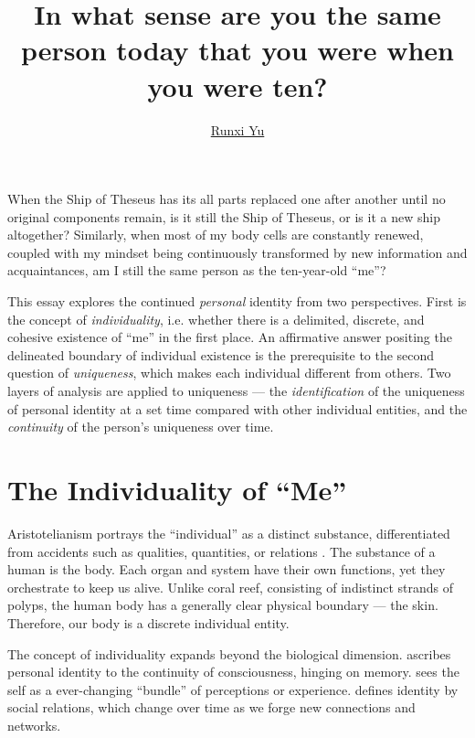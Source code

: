 \documentclass[a4paper,english,12pt]{scrartcl}
\begin{document}
\title{In what sense are you the same person today that you were when you
were ten?}
\author{\href{https://www.andrewyu.org/}{Runxi Yu}}
\date{}

\maketitle

\noindent When the Ship of Theseus has its all parts replaced one
after another until no original components remain, is it still the
Ship of Theseus, or is it a new ship altogether?  Similarly, when
most of my body cells are constantly renewed, coupled with my mindset
being continuously transformed by new information and acquaintances,
am I still the same person as the ten-year-old ``me''?

This essay explores the continued \emph{personal} identity from two
perspectives. First is the concept of \emph{individuality}, i.e. whether
there is a delimited, discrete, and cohesive existence of ``me''
in the first place. An affirmative answer positing the delineated
boundary of individual existence is the prerequisite to the second
question of \emph{uniqueness}, which makes each individual different
from others. Two layers of analysis are applied to uniqueness
--- the \emph{identification} of the uniqueness of personal identity
at a set time compared with other individual entities, and the \emph{continuity}
of the person's uniqueness over time.

\section{The Individuality of ``Me''}

Aristotelianism portrays the ``individual'' as a distinct substance,
differentiated from accidents such as qualities, quantities, or relations
\parencite{MetaphysicsZeta}. The substance of a human is the body.
Each organ and system have their own functions, yet they orchestrate
to keep us alive. Unlike coral reef, consisting of indistinct strands
of polyps, the human body has a generally clear physical boundary
--- the skin. Therefore, our body is a discrete individual
entity.

The concept of individuality expands beyond the biological dimension.
\textcite{LockeHumanUnderstanding} ascribes personal identity to
the continuity of consciousness, hinging on memory. \textcite{DavidHume} sees the self
as a ever-changing “bundle” of perceptions or experience. \textcite{Mead1934MindSA} defines identity by social relations,
which change over time as we forge new connections and networks.
\end{document}
